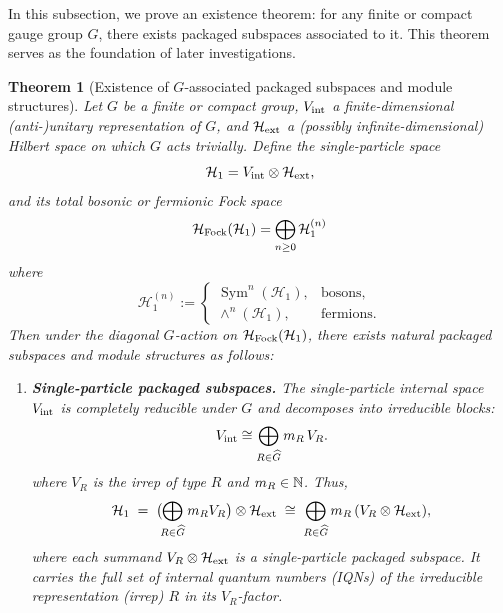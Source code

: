 \documentclass[12pt,a4paper]{article}
\newtheorem{theorem}{Theorem}
\begin{document}
In this subsection, we prove an existence theorem:
for any finite or compact gauge group $G$, there exists packaged subspaces associated to it.
This theorem serves as the foundation of later investigations.


\begin{theorem}[Existence of $G$-associated packaged subspaces and module structures]
	\label{THM:ExistenceOfGAssociatedPackagedStates}	
	Let $G$ be a finite or compact group, $V_{\rm int}$ a finite-dimensional (anti-)unitary representation of $G$, and $\mathcal H_{\rm ext}$ a (possibly infinite-dimensional) Hilbert space on which $G$ acts trivially.
	Define the single-particle space
	\begin{equation}\label{EQ:SingleParticleSpace}
		\mathcal H_1 = V_{\rm int} \otimes\mathcal H_{\rm ext},
	\end{equation}
	and its total bosonic or fermionic Fock space
	\begin{equation}\label{EQ:FullFockSpace}
		\mathcal H_{\rm Fock}(\mathcal H_1)
		= \bigoplus_{n \ge 0} \mathcal H_1^{(n)}
	\end{equation}
	where
	\begin{equation}\label{EQ:NParticleSector}
		\mathcal H_1^{(n)} :=
		\begin{cases}
			\operatorname{Sym}^n(\mathcal H_1), & \text{bosons},\\
			\wedge^n(\mathcal H_1), & \text{fermions}.
		\end{cases}
	\end{equation}
	Then under the diagonal $G$‐action on $\mathcal H_{\rm Fock}(\mathcal H_1)$, there exists natural packaged subspaces and module structures as follows:
			
	\begin{enumerate}
		\item \textbf{Single-particle packaged subspaces.}				
		The single-particle internal space $V_{\rm int}$ is completely reducible under $G$ and decomposes into irreducible blocks:
		$$
			V_{\rm int} \cong \bigoplus_{R \in \widehat G} m_R \, V_R.
		$$
		where $V_R$ is the irrep of type $R$ and $m_R\in\Bbb N$.
		Thus,
		\begin{equation}\label{EQ:SingleParticleDecomposition}
			\mathcal H_1
			\;=\;
			\bigl(\!\bigoplus_{R \in \widehat G} m_R V_R\bigr)\otimes \mathcal{H}_{\rm ext}
			\;\cong\;
			\bigoplus_{R \in \widehat G} m_R\,(V_R \otimes \mathcal{H}_{\rm ext}), 
		\end{equation}
		where each summand $V_R \otimes \mathcal{H}_{\rm ext}$ is a single-particle packaged subspace.
		It carries the full set of internal quantum numbers (IQNs) of the irreducible representation (irrep) $R$ in its $V_R$-factor.
		

\end{enumerate}
\end{theorem}
\end{document}
